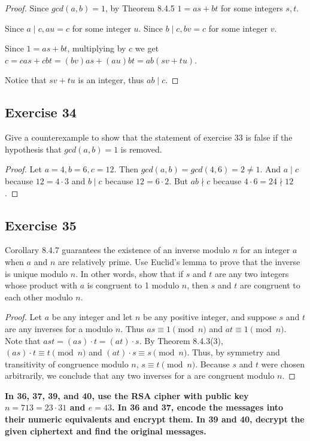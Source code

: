 \documentclass[14pt]{extarticle}
\newcommand{\cy}{\color{cyan}}
\begin{document}
\begin{proof}
Since \(gcd(a,b) = 1\), by Theorem 8.4.5 \(1 = as+bt\) for some integers \(s,t\).

Since \(a \mid c, au = c\) for some integer $u$. Since \(b \mid c, bv = c\) for some integer $v$.

Since \(1 = as+bt\), multiplying by $c$ we get \(c = cas + cbt = (bv)as + (au)bt = ab(sv + tu)\).

Notice that \(sv+tu\) is an integer, thus \(ab \mid c\).
\end{proof}

\subsection{Exercise 34}
Give a counterexample to show that the statement of exercise 33 is false if the hypothesis that \(gcd(a, b)=1\) 
is removed.

\begin{proof}
Let \(a = 4, b = 6, c = 12\). Then \(gcd(a,b) = gcd(4,6) = 2 \neq 1\). And \(a \mid c\) because \(12 = 4 \cdot 3\) and
\(b \mid c\) because \(12 = 6 \cdot 2\). But \(ab \nmid c\) because \(4 \cdot 6 = 24 \nmid 12\).
\end{proof}

\subsection{Exercise 35}
Corollary 8.4.7 guarantees the existence of an inverse modulo $n$ for an integer $a$ when $a$ and $n$ are 
relatively prime. Use Euclid’s lemma to prove that the inverse is unique modulo $n$. In other words, show that if 
$s$ and $t$ are any two integers whose product with $a$ is congruent to 1 modulo $n$, then $s$ and $t$ are congruent 
to each other modulo $n$.

\begin{proof}
Let $a$ be any integer and let $n$ be any positive integer, and suppose $s$ and $t$ are any inverses for a modulo $n$. Thus \(as \equiv 1 \pmod n\) and \(at \equiv 1 \pmod n\). Note that \(ast = (as) \cdot t = (at) \cdot s\). By Theorem 
8.4.3(3), \((as) \cdot t \equiv t \pmod n\) and \((at) \cdot s \equiv s \pmod n\). Thus, by symmetry and 
transitivity of congruence modulo $n$, \(s \equiv t \pmod n\). Because $s$ and $t$ were chosen arbitrarily, we 
conclude that any two inverses for a are congruent modulo $n$.
\end{proof}

{\bf \cy In 36, 37, 39, and 40, use the RSA cipher with public key \(n = 713 = 23 \cdot 31\) and \(e = 43\). In 36 
and 37, encode the messages into their numeric equivalents and encrypt them. In 39 and 40, decrypt the given 
ciphertext and find the original messages.}
\end{document}
